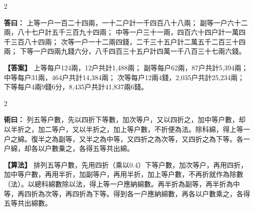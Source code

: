 \documentclass[11pt,a4paper]{article}
\newcommand{\ClassicalAnswer}[1]{\par\noindent\textbf{\color{answercolor}答曰：}#1\par}
\newcommand{\ClassicalMethod}[1]{\par\noindent\textbf{\color{methodcolor}術曰：}#1\par}
\newcommand{\ModernAnswer}[1]{\par\noindent\textbf{\color{answercolor}【答案】}#1\par}
\newcommand{\ModernMethod}[1]{\par\noindent\textbf{\color{methodcolor}【算法】}#1\par}
\begin{document}
\begin{paracol}{2}

\ClassicalAnswer{%
上等一户一百二十四兩，一十二户計一千四百八十八兩；
副等一户六十二兩，八十七户計五千三百九十四兩；
中等一户三十一兩，四百六十四户計一萬四千三百八十四兩；
次等一户一十二兩四錢，二千三十五户計二萬五千二百三十四兩；
下等一户四兩九錢六分，八千四百三十五户計四萬一千八百三十七兩六錢。}

\switchcolumn

\ModernAnswer{%
上等每户124兩，12户共計1,488兩；
副等每户62兩，87户共計5,394兩；
中等每户31兩，464户共計14,384兩；
次等每户12兩4錢，2,035户共計25,234兩；
下等每户4兩9錢6分，8,435户共計41,837兩6錢。
}

\end{paracol}

\begin{paracol}{2}

\ClassicalMethod{%
列五等户數，先以四折下等數，加次等户，又以四折之，加中等户數，却以半折之，加二等户，又以半折之，加上等户數，不折便為法。除科綿，得上等一户之綿。復半之為副等，又半之為中等，又四折之為次等，又四折之為下等。各一户綿，却各以户數乗之，各得五等共出綿。}

\switchcolumn

\ModernMethod{%
排列五等户數，先用四折（乘以0.4）下等户數，加次等户，再用四折，加中等户數，再用半折，加副等户，再用半折，加上等户數，不再折就作為除數（法）。以總科綿數除以法，得上等一户應納綿數。再半折為副等，再半折為中等，再四折為次等，再四折為下等。得到各一户應納綿數，再各以户數乘之，各得五等共出綿數。
}

\end{paracol}
\end{document}
